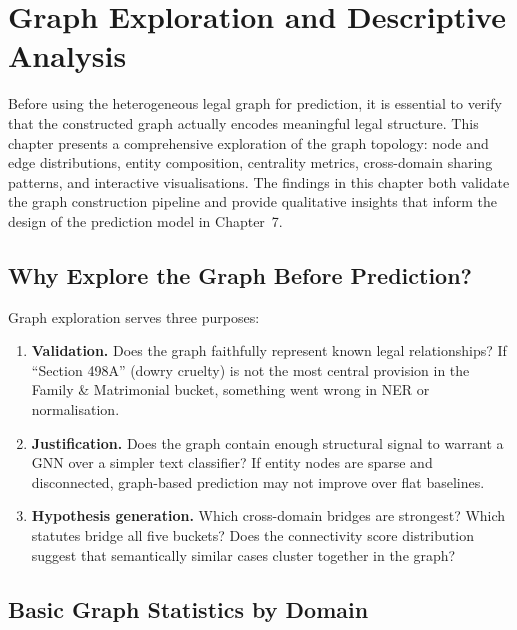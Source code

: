 \chapter{Graph Exploration and Descriptive Analysis}
\label{ch:graph-explore}

Before using the heterogeneous legal graph for prediction, it is essential to verify that the constructed graph actually encodes meaningful legal structure. This chapter presents a comprehensive exploration of the graph topology: node and edge distributions, entity composition, centrality metrics, cross-domain sharing patterns, and interactive visualisations. The findings in this chapter both validate the graph construction pipeline and provide qualitative insights that inform the design of the prediction model in Chapter~7.

\section{Why Explore the Graph Before Prediction?}
\label{sec:explore-why}

Graph exploration serves three purposes:

\begin{enumerate}
    \item \textbf{Validation.} Does the graph faithfully represent known legal relationships? If ``Section 498A'' (dowry cruelty) is not the most central provision in the Family \& Matrimonial bucket, something went wrong in NER or normalisation.
    \item \textbf{Justification.} Does the graph contain enough structural signal to warrant a GNN over a simpler text classifier? If entity nodes are sparse and disconnected, graph-based prediction may not improve over flat baselines.
    \item \textbf{Hypothesis generation.} Which cross-domain bridges are strongest? Which statutes bridge all five buckets? Does the connectivity score distribution suggest that semantically similar cases cluster together in the graph?
\end{enumerate}

\section{Basic Graph Statistics by Domain}
\label{sec:basic-stats}

